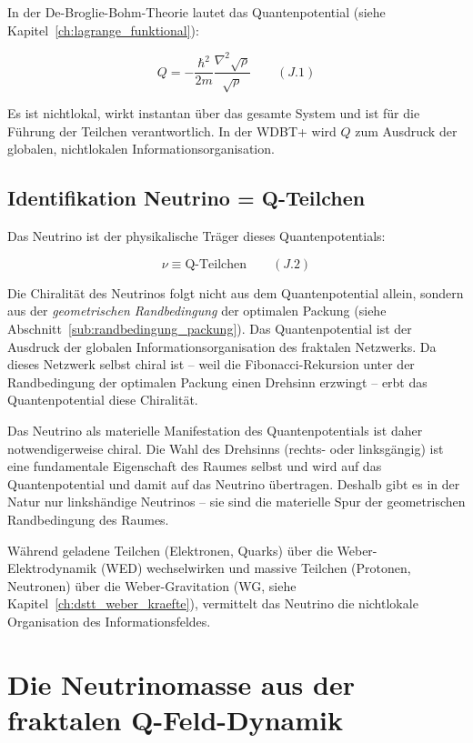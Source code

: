 In der De-Broglie-Bohm-Theorie lautet das Quantenpotential (siehe Kapitel~\ref{ch:lagrange_funktional}):

\[
Q = -\frac{\hbar^2}{2m} \frac{\nabla^2 \sqrt{\rho}}{\sqrt{\rho}} \qquad (J.1)
\]

Es ist nichtlokal, wirkt instantan über das gesamte System und ist für die Führung der Teilchen verantwortlich. In der WDBT+ wird \( Q \) zum Ausdruck der globalen, nichtlokalen Informationsorganisation.

\subsection{Identifikation Neutrino = Q-Teilchen}
\label{sub:neutrino_oszillation_identifikation}

Das Neutrino ist der physikalische Träger dieses Quantenpotentials:

\[
\nu \equiv \text{Q-Teilchen} \qquad (J.2)
\]

Die Chiralität des Neutrinos folgt nicht aus dem Quantenpotential allein, sondern aus der \emph{geometrischen Randbedingung} der optimalen Packung (siehe Abschnitt~\ref{sub:randbedingung_packung}). Das Quantenpotential ist der Ausdruck der globalen Informationsorganisation des fraktalen Netzwerks. Da dieses Netzwerk selbst chiral ist – weil die Fibonacci-Rekursion unter der Randbedingung der optimalen Packung einen Drehsinn erzwingt – erbt das Quantenpotential diese Chiralität.

Das Neutrino als materielle Manifestation des Quantenpotentials ist daher notwendigerweise chiral. Die Wahl des Drehsinns (rechts- oder linksgängig) ist eine fundamentale Eigenschaft des Raumes selbst und wird auf das Quantenpotential und damit auf das Neutrino übertragen. Deshalb gibt es in der Natur nur linkshändige Neutrinos – sie sind die materielle Spur der geometrischen Randbedingung des Raumes.

Während geladene Teilchen (Elektronen, Quarks) über die Weber-Elektrodynamik (WED) wechselwirken und massive Teilchen (Protonen, Neutronen) über die Weber-Gravitation (WG, siehe Kapitel~\ref{ch:dstt_weber_kraefte}), vermittelt das Neutrino die nichtlokale Organisation des Informationsfeldes.

\section{Die Neutrinomasse aus der fraktalen Q-Feld-Dynamik}
\label{app:neutrino_oszillation_masse}

